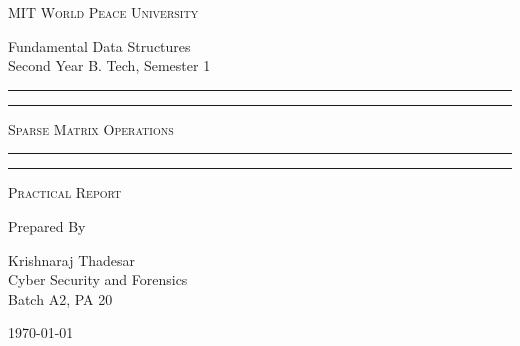 \documentclass[11pt]{article}
\begin{document}
\begin{titlepage}
	\centering


	\huge\textsc{
		MIT World Peace University
	}\\

	\vspace{0.75\baselineskip} %

	\LARGE{
		Fundamental Data Structures\\
		Second Year B. Tech, Semester 1
	}

	\vfill %


	\rule{\textwidth}{1.6pt}\vspace*{-\baselineskip}\vspace*{2pt}
	\rule{\textwidth}{0.6pt}
	\vspace{0.75\baselineskip} %



	\huge{\textsc{
			Sparse Matrix Operations
		}} \\



	\vspace{0.5\baselineskip} %
	\rule{\textwidth}{0.6pt}\vspace*{-\baselineskip}\vspace*{2.8pt}
	\rule{\textwidth}{1.6pt}

	\vspace{1\baselineskip} %


	\LARGE\textsc{
		Practical Report
	} %
	\vfill


	Prepared By
	\vspace{0.5\baselineskip} %

	\Large{
		Krishnaraj Thadesar \\
		Cyber Security and Forensics\\
		Batch A2, PA 20
	}


	\vspace{0.5\baselineskip} %
	\today

\end{titlepage}
\end{document}
